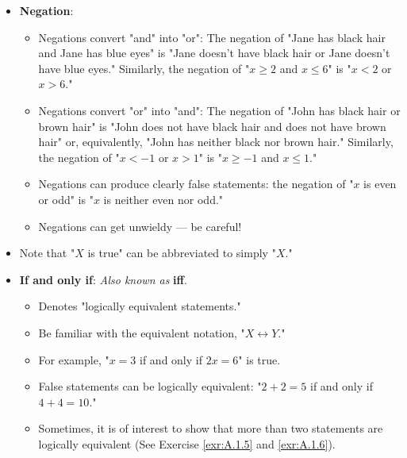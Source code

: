 \documentclass[../main.tex]{subfiles}
\begin{document}
\begin{itemize}
\begin{itemize}
    \end{itemize}
    \item \textbf{Negation}: 
    \begin{itemize}
        \item Negations convert "and" into "or": The negation of "Jane has black hair and Jane has blue eyes" is "Jane doesn't have black hair or Jane doesn't have blue eyes." Similarly, the negation of "$x\geq 2$ and $x\leq 6$" is "$x<2$ or $x>6$."
        \item Negations convert "or" into "and": The negation of "John has black hair or brown hair" is "John does not have black hair and does not have brown hair" or, equivalently, "John has neither black nor brown hair." Similarly, the negation of "$x<-1$ or $x>1$" is "$x\geq -1$ and $x\leq 1$."
        \item Negations can produce clearly false statements: the negation of "$x$ is even or odd" is "$x$ is neither even nor odd."
        \item Negations can get unwieldy --- be careful!
    \end{itemize}
    \item Note that "$X$ is true" can be abbreviated to simply "$X$."
    \item \textbf{If and only if}:  \emph{Also known as} \textbf{iff}.
    \begin{itemize}
        \item Denotes "logically equivalent statements."
        \item Be familiar with the equivalent notation, "$X\leftrightarrow Y$."
        \item For example, "$x=3$ if and only if $2x=6$" is true.
        \item False statements can be logically equivalent: "$2+2=5$ if and only if $4+4=10$."
        \item Sometimes, it is of interest to show that more than two statements are logically equivalent (See Exercise \ref{exr:A.1.5} and \ref{exr:A.1.6}).
    \end{itemize}
\end{itemize}
\end{document}
